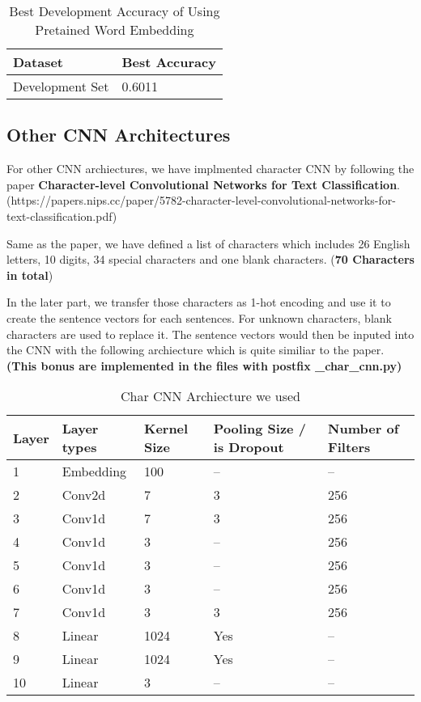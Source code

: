 \documentclass{article}
\begin{document}
\begin{table}[htb]
	\caption{Best Development Accuracy of Using Pretained Word Embedding}
	\label{sample-table}
	\centering
	\begin{tabular}{ll}
		\toprule
		\cmidrule{1-2}
		Dataset & Best Accuracy\\
		\midrule
		Development Set & 0.6011  \\
		\bottomrule
	\end{tabular}
\end{table}


\subsection{Other CNN Architectures}
For other CNN archiectures, we have implmented character CNN by following the paper \textbf{Character-level Convolutional Networks for Text Classification}. (https://papers.nips.cc/paper/5782-character-level-convolutional-networks-for-text-classification.pdf) 

Same as the paper, we have defined a list of characters which includes 26 English letters, 10 digits, 34 special characters and one blank characters. (\textbf{70 Characters in total})

In the later part, we transfer those characters as 1-hot encoding and use it to create the sentence vectors for each sentences. For unknown characters, blank characters are used to replace it. The sentence vectors would then be inputed into the CNN with the following archiecture which is quite similiar to the paper.  \textbf{(This bonus are implemented in the files with postfix \_char\_cnn.py)}

\begin{table}[htb]
\caption{Char CNN Archiecture we used}
	\label{sample-table}
	\centering
\begin{tabular}{lllll}
\toprule
		\cmidrule{1-5}
		Layer & Layer types & Kernel Size & Pooling Size / is Dropout & Number of Filters 		\\
		\midrule
 			1 & Embedding & 100 & -- & -- \\
 			2 & Conv2d & 7 & 3 & 256 \\
 			3 & Conv1d & 7 & 3 & 256 \\
 			4 & Conv1d & 3 & -- & 256 \\
 			5 & Conv1d & 3 & -- & 256\\
 			6 & Conv1d & 3 & -- & 256 \\
 			7 & Conv1d & 3 & 3 & 256 \\
 			8 & Linear & 1024 & Yes & -- \\
 			9 & Linear & 1024 & Yes & -- \\
 			10 & Linear & 3 & -- & -- \\
\bottomrule
\end{tabular}
\end{table}
\end{document}

